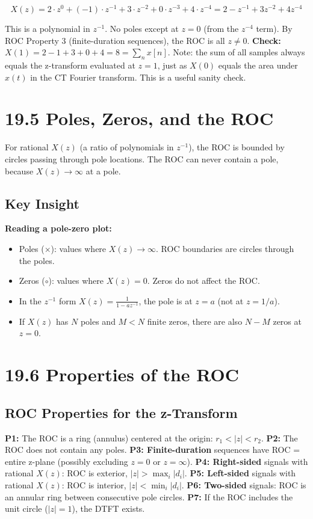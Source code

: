 \documentclass[11pt]{article}
\begin{document}
\[X(z) = 2 \cdot z^0 + (-1) \cdot z^{-1} + 3 \cdot z^{-2} + 0 \cdot z^{-3} + 4 \cdot z^{-4} = 2 - z^{-1} + 3 z^{-2} + 4 z^{-4}\]

This is a polynomial in $z^{-1}$. No poles except at $z = 0$ (from the $z^{-4}$ term). By ROC Property 3 (finite-duration sequences), the ROC is all $z \neq 0$.
\textbf{Check:} $X(1) = 2 - 1 + 3 + 0 + 4 = 8 = \sum_n x[n]$. \checkmark
Note: the sum of all samples always equals the z-transform evaluated at $z = 1$, just as $X(0)$ equals the area under $x(t)$ in the CT Fourier transform. This is a useful sanity check.

\section*{19.5 Poles, Zeros, and the ROC}

For rational $X(z)$ (a ratio of polynomials in $z^{-1}$), the ROC is bounded by circles passing through pole locations. The ROC can never contain a pole, because $X(z) \to \infty$ at a pole.

\subsection*{Key Insight}

\textbf{Reading a pole-zero plot:}

\begin{itemize}
  \item Poles ($\times$): values where $X(z) \to \infty$. ROC boundaries are circles through the poles.
  \item Zeros ($\circ$): values where $X(z) = 0$. Zeros do not affect the ROC.
  \item In the $z^{-1}$ form $X(z) = \frac{1}{1 - az^{-1}}$, the pole is at $z = a$ (not at $z = 1/a$).
  \item If $X(z)$ has $N$ poles and $M < N$ finite zeros, there are also $N - M$ zeros at $z = 0$.
\end{itemize}

\section*{19.6 Properties of the ROC}

\subsection*{ROC Properties for the z-Transform}

\textbf{P1:} The ROC is a ring (annulus) centered at the origin: $r_1 < |z| < r_2$.
\textbf{P2:} The ROC does not contain any poles.
\textbf{P3: Finite-duration} sequences have ROC = entire z-plane (possibly excluding $z = 0$ or $z = \infty$).
\textbf{P4: Right-sided} signals with rational $X(z)$: ROC is exterior, $|z| > \max_i |d_i|$.
\textbf{P5: Left-sided} signals with rational $X(z)$: ROC is interior, $|z| < \min_i |d_i|$.
\textbf{P6: Two-sided} signals: ROC is an annular ring between consecutive pole circles.
\textbf{P7:} If the ROC includes the unit circle ($|z| = 1$), the DTFT exists.
\end{document}
